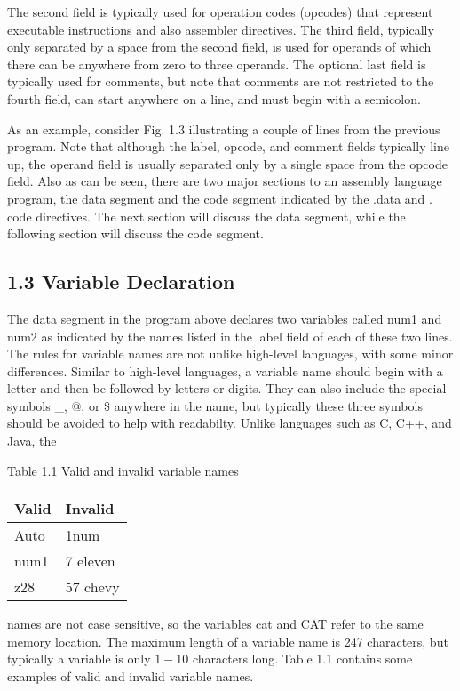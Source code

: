 \documentclass[10pt]{article}
\begin{document}
The second field is typically used for operation codes (opcodes) that represent executable instructions and also assembler directives. The third field, typically only separated by a space from the second field, is used for operands of which there can be anywhere from zero to three operands. The optional last field is typically used for comments, but note that comments are not restricted to the fourth field, can start anywhere on a line, and must begin with a semicolon.

As an example, consider Fig. 1.3 illustrating a couple of lines from the previous program. Note that although the label, opcode, and comment fields typically line up, the operand field is usually separated only by a single space from the opcode field. Also as can be seen, there are two major sections to an assembly language program, the data segment and the code segment indicated by the .data and . code directives. The next section will discuss the data segment, while the following section will discuss the code segment.

\subsection*{1.3 Variable Declaration}
The data segment in the program above declares two variables called num1 and num2 as indicated by the names listed in the label field of each of these two lines. The rules for variable names are not unlike high-level languages, with some minor differences. Similar to high-level languages, a variable name should begin with a letter and then be followed by letters or digits. They can also include the special symbols \_, @, or \$ anywhere in the name, but typically these three symbols should be avoided to help with readabilty. Unlike languages such as C, C++, and Java, the

Table 1.1 Valid and invalid variable names

\begin{center}
\begin{tabular}{|l|l|}
\hline
Valid & Invalid \\
\hline
Auto & 1num \\
\hline
num1 & 7 eleven \\
\hline
z28 & 57 chevy \\
\hline
\end{tabular}
\end{center}

names are not case sensitive, so the variables cat and CAT refer to the same memory location. The maximum length of a variable name is 247 characters, but typically a variable is only $1-10$ characters long. Table 1.1 contains some examples of valid and invalid variable names.
\end{document}
